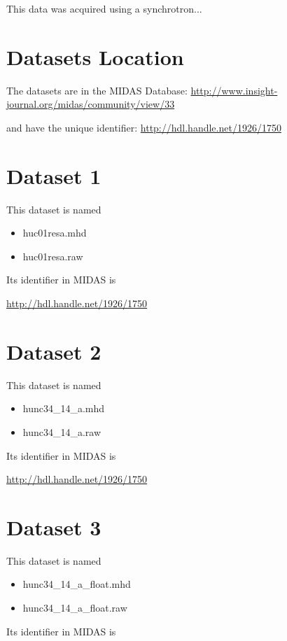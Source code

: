 \documentclass{InsightArticle}
\begin{document}
This data was acquired using a synchrotron...


\section{Datasets Location}

The datasets are in the MIDAS Database:
\url{http://www.insight-journal.org/midas/community/view/33}

and have the unique identifier:
\url{http://hdl.handle.net/1926/1750}


\section{Dataset 1}

This dataset is named

\begin{itemize}
\item huc01resa.mhd
\item huc01resa.raw
\end{itemize}

Its identifier in MIDAS is

\url{http://hdl.handle.net/1926/1750}

\section{Dataset 2}

This dataset is named

\begin{itemize}
\item hunc34\_14\_a.mhd
\item hunc34\_14\_a.raw
\end{itemize}

Its identifier in MIDAS is

\url{http://hdl.handle.net/1926/1750}


\section{Dataset 3}


This dataset is named

\begin{itemize}
\item hunc34\_14\_a\_float.mhd
\item hunc34\_14\_a\_float.raw
\end{itemize}

Its identifier in MIDAS is
\end{document}
